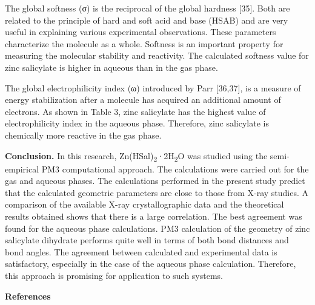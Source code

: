 The global softness (σ) is the reciprocal of the global hardness
{[}35{]}. Both are related to the principle of hard and soft acid and
base (HSAB) and are very useful in explaining various experimental
observations. These parameters characterize the molecule as a whole.
Softness is an important property for measuring the molecular stability
and reactivity. The calculated softness value for zinc salicylate is
higher in aqueous than in the gas phase.

The global electrophilicity index (ω) introduced by Parr {[}36,37{]}, is
a measure of energy stabilization after a molecule has acquired an
additional amount of electrons. As shown in Table 3, zinc salicylate has
the highest value of electrophilicity index in the aqueous phase.
Therefore, zinc salicylate is chemically more reactive in the gas phase.

{\bfseries Conclusion.} In this research,
Zn(HSal)\textsubscript{2}·2H\textsubscript{2}O was studied using the
semi-empirical PM3 computational approach. The calculations were carried
out for the gas and aqueous phases. The calculations performed in the
present study predict that the calculated geometric parameters are close
to those from X-ray studies. A comparison of the available X-ray
crystallographic data and the theoretical results obtained shows that
there is a large correlation. The best agreement was found for the
aqueous phase calculations. PM3 calculation of the geometry of zinc
salicylate dihydrate performs quite well in terms of both bond distances
and bond angles. The agreement between calculated and experimental data
is satisfactory, especially in the case of the aqueous phase
calculation. Therefore, this approach is promising for application to
such systems.

{\bfseries References}


